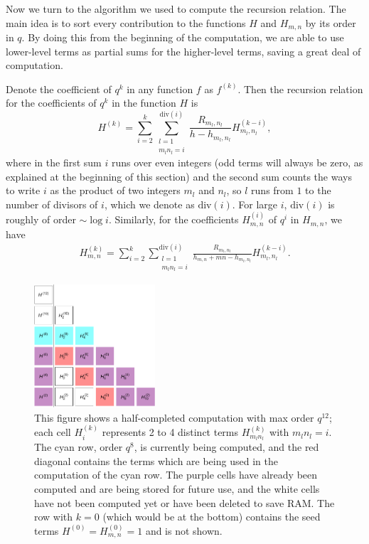 \documentclass[12pt]{article}
\numberwithin{equation}{section}
\def\m{\mu}
\newcommand{\be}{\begin{eqnarray}}
\newcommand{\ee}{\end{eqnarray}}
\begin{document}
Now we turn to the algorithm we used to compute the recursion relation. The main idea is to sort every contribution to the functions $H$ and $H_{m,n}$ by its order in $q$. By doing this from the beginning of the computation, we are able to use lower-level terms as partial sums for the higher-level terms, saving a great deal of computation.

Denote the coefficient of $q^k$ in any function $f$ as $f^{(k)}$. Then the recursion relation for the coefficients of $q^k$ in the function $H$ is
\begin{equation}\label{eq:recursion1}
	H^{(k)} = \sum_{i=2}^k \sum_{\substack{l=1\\m_ln_l=i}}^{\text{div}(i)} \frac{R_{m_l,n_l}}{h - h_{m_l,n_l}} H_{m_l,n_l}^{(k-i)},
\end{equation}
where in the first sum $i$ runs over even integers (odd terms will always be zero, as explained at the beginning of this section) and the second sum counts the ways to write  $i$ as the product of two integers $m_l$ and $n_l$, so $l$ runs from $1$ to the number of divisors of $i$, which we denote as $\text{div}(i)$. For large $i$, $\text{div}(i)$ is roughly of order $\sim \log i$. Similarly, for the coefficients $H^{(i)}_{m,n}$ of $q^i$ in $H_{m,n}$, we have
\be\label{eq:recursion2}
H^{(k)}_{m,n}=\sum_{i=2}^k\sum_{\substack{l=1\\m_ln_l=i}}^{\text{div}(i)}\frac{ R_{m_l,n_l}}{h_{m,n}+mn-h_{m_l,n_l}}H_{m_l,n_l}^{(k-i)}.
\ee
\begin{figure}
\centering
\includegraphics[width=0.4\textwidth]{HTriangle.pdf}
	\caption{This figure shows a half-completed computation with max order $q^{12}$; each cell $H^{(k)}_i$ represents 2 to 4 distinct terms $H^{(k)}_{m_ln_l}$ with $m_ln_l=i$. The cyan row, order $q^8$, is currently being computed, and the red diagonal contains the terms which are being used in the computation of the cyan row. The purple cells have already been computed and are being stored for future use, and the white cells have not been computed yet or have been deleted to save RAM. The row with $k=0$ (which would be at the bottom) contains the seed terms $H^{(0)}=H^{(0)}_{m,n}=1$ and is not shown.}
\label{fig:HTriangle}
\end{figure}
\end{document}
